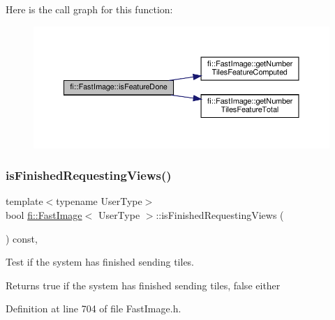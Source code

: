Here is the call graph for this function\+:
\nopagebreak
\begin{figure}[H]
\begin{center}
\leavevmode
\includegraphics[width=350pt]{dc/d6b/classfi_1_1FastImage_aace944dbe0639a772d2f37ff3804580a_cgraph}
\end{center}
\end{figure}
\mbox{\label{classfi_1_1FastImage_a9a9ebae36096801272a6a8bf8260ef05}} 
\subsubsection{\texorpdfstring{is\+Finished\+Requesting\+Views()}{isFinishedRequestingViews()}}
{\footnotesize\ttfamily template$<$typename User\+Type$>$ \\
bool \hyperlink{classfi_1_1FastImage}{fi\+::\+Fast\+Image}$<$ User\+Type $>$\+::is\+Finished\+Requesting\+Views (\begin{DoxyParamCaption}{ }\end{DoxyParamCaption}) const\hspace{0.3cm}{\ttfamily [inline]}, {\ttfamily [private]}}



Test if the system has finished sending tiles. 

\begin{DoxyReturn}{Returns}
true if the system has finished sending tiles, false either 
\end{DoxyReturn}


Definition at line 704 of file Fast\+Image.\+h.


